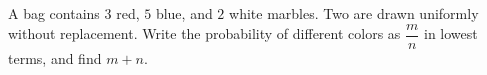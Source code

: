 A bag contains $3$ red, $5$ blue, and $2$ white marbles. Two are drawn uniformly without replacement. Write the probability of different colors as $\dfrac{m}{n}$ in lowest terms, and find $m+n$.
